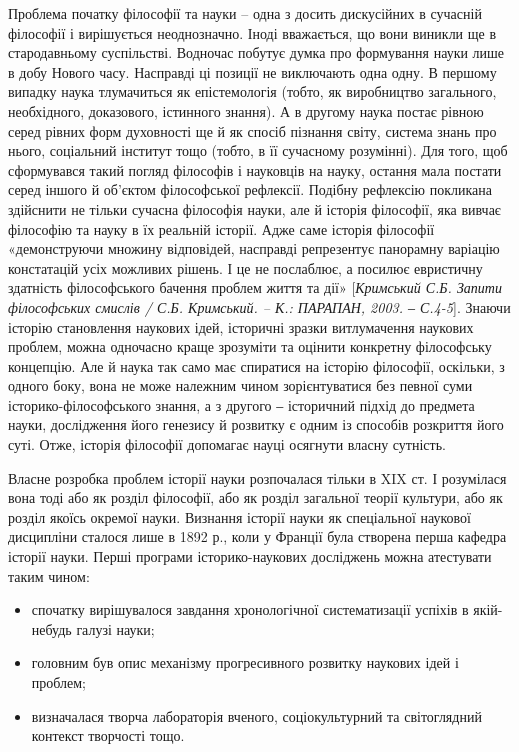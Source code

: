 Проблема початку філософії та науки – одна з досить дискусійних в
сучасній філософії і вирішується неоднозначно. Іноді вважається, що вони
виникли ще в стародавньому суспільстві. Водночас побутує думка про
формування науки лише в добу Нового часу. Насправді ці позиції не
виключають одна одну. В першому випадку наука тлумачиться як
епістемологія (тобто, як виробництво загального, необхідного, доказового,
істинного знання). А в другому наука постає рівною серед рівних форм
духовності ще й як спосіб пізнання світу, система знань про нього, соціальний
інститут тощо (тобто, в її сучасному розумінні). Для того, щоб сформувався
такий погляд філософів і науковців на науку, остання мала постати серед
іншого й об’єктом філософської рефлексії. Подібну рефлексію покликана
здійснити не тільки сучасна філософія науки, але й історія філософії, яка вивчає
філософію та науку в їх реальній історії. Адже саме історія філософії
«демонструючи множину відповідей, насправді репрезентує панорамну
варіацію констатацій усіх можливих рішень. І це не послаблює, а посилює
евристичну здатність філософського бачення проблем життя та дії» [\textit{Кримський
С.Б. Запити філософських смислів / С.Б. Кримський. – К.: ПАРАПАН, 2003. ‒
С.4-5}]. Знаючи історію становлення наукових ідей, історичні зразки
витлумачення наукових проблем, можна одночасно краще зрозуміти та оцінити
конкретну філософську концепцію. Але й наука так само має спиратися на
історію філософії, оскільки, з одного боку, вона не може належним чином
зорієнтуватися без певної суми історико-філософського знання, а з другого ‒
історичний підхід до предмета науки, дослідження його генезису й розвитку є
одним із способів розкриття його суті. Отже, історія філософії допомагає науці
осягнути власну сутність.

Власне розробка проблем історії науки розпочалася тільки в XIX ст. І
розумілася вона тоді або як розділ філософії, або як розділ загальної теорії
культури, або як розділ якоїсь окремої науки. Визнання історії науки як
спеціальної наукової дисципліни сталося лише в 1892 р., коли у Франції була
створена перша кафедра історії науки. Перші програми історико-наукових
досліджень можна атестувати таким чином:
\begin{itemize}
	\item спочатку вирішувалося завдання хронологічної систематизації успіхів в
	якій-не\-будь галузі науки;
	
	\item головним був опис механізму прогресивного розвитку наукових ідей і
	проблем;
	
	\item визначалася творча лабораторія вченого, соціокультурний та світоглядний
	контекст творчості тощо.
\end{itemize}

